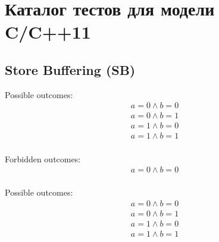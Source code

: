 \newcommand{\lbJoinTemplate}[4]{
  \codePrefix
  $\writeInstParam{\rlx}{x}{0}; \writeInstParam{\rlx}{y}{0};$ \\
\begin{tabular}{L || L || L || L}
  \readInstParam{#1}{a}{y}; & \skipc & \readInstParam{#3}{b}{x}; & \skipc \\
  \writeInstParam{\rlx}{z1}{a} & & \writeInstParam{\rlx}{z2}{b} &  \\
  \multicolumn{2}{c ||}{$\writeInstParam{#2}{x}{1}$} &
  \multicolumn{2}{c}{$\writeInstParam{#4}{y}{1}$} \\
\end{tabular}
  \codePostfix
}

\chapter{Каталог тестов для модели C/C++11}
\label{sec:litmusTests}

\section{Store Buffering (SB)}
\label{app:sb}

%
\begin{minipage}[t]{0.3\linewidth}
Possible outcomes:\\
\[\begin{array}{l}
a = 0 \land b = 0\\
a = 0 \land b = 1\\
a = 1 \land b = 0\\
a = 1 \land b = 1\\
\end{array}\]
\end{minipage}
%
\sbTemplate{\rel}{\rel}{\rel}{\acq}{\rel}{\acq}
\litmusTestEnd


\begin{minipage}[t]{0.3\linewidth}
Forbidden outcomes:\\
\[\begin{array}{l}
a = 0 \land b = 0\\
\end{array}\]
\end{minipage}
%
\sbTemplate{\sco}{\sco}{\sco}{\sco}{\sco}{\sco}
\litmusTestEnd

\begin{minipage}[t]{0.3\linewidth}
Possible outcomes:\\
\[\begin{array}{l}
a = 0 \land b = 0\\
a = 0 \land b = 1\\
a = 1 \land b = 0\\
a = 1 \land b = 1\\
\end{array}\]
\end{minipage}
%
\sbTemplate{\sco}{\sco}{\rel}{\sco}{\sco}{\sco}
\litmusTestEnd

